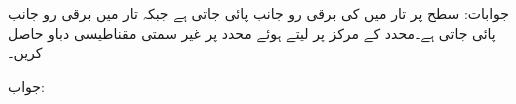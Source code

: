جوابات: 
سطح  پر تار  میں  کی برقی رو  جانب پائی جاتی ہے جبکہ تار  میں  برقی رو  جانب پائی جاتی ہے۔محدد کے مرکز پر  لیتے ہوئے  محدد پر غیر سمتی مقناطیسی دباو  حاصل کریں۔

جواب:
